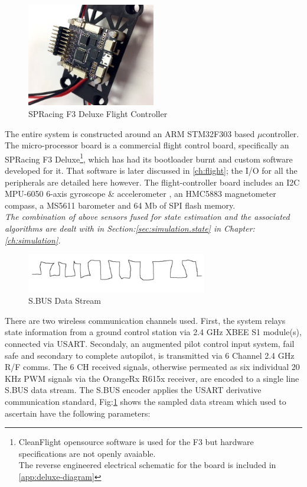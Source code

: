 \par
\begin{figure}
\centering
\includegraphics[width=0.5\textwidth]{figs/f3-deluxe}
\caption{SPRacing F3 Deluxe Flight Controller}
\end{figure}
The entire system is constructed around an ARM STM32F303\cite{stm32f303} based $\mu$controller. The micro-processor board is a commercial flight control board, specifically an SPRacing F3 Deluxe\cite{spracing}\footnote{CleanFlight opensource software is used for the F3 but hardware specifications are not openly avaiable.\\The reverse engineered electrical schematic for the board is included in \ref{app:deluxe-diagram}}, which has had its bootloader burnt and custom software developed for it. That software is later discussed in \ref{ch:flight}; the I/O for all the peripherals are detailed here however. The flight-controller board includes an I2C MPU-6050\cite{mpu6050} 6-axis gyroscope \& accelerometer , an HMC5883\cite{hmc5883} magnetometer compass, a MS5611\cite{ms5611} barometer and 64 Mb of SPI flash memory. 
\\
\emph{\color{Gray} The combination of above sensors fused for state estimation and the associated algorithms are dealt with in Section:\ref{sec:simulation.state} in Chapter:\ref{ch:simulation}.}
\par
\begin{figure}[hbtp]
\centering
\includegraphics[width=0.7\textwidth]{figs/sbus}
\caption{S.BUS Data Stream}
\label{fig:sbus}
\end{figure}
There are two wireless communication channels used. First, the system relays state information from a ground control station via 2.4 GHz XBEE S1 module(s)\cite{xbees1}, connected via USART. Secondaly, an augmented pilot control input system, fail safe and secondary to complete autopilot, is transmitted via 6 Channel 2.4 GHz R/F comms. The 6 CH received signals, otherwise permeated as six individual 20 KHz PWM signals via the OrangeRx R615x\cite{r615x} receiver, are encoded to a single line S.BUS data stream. The S.BUS encoder \cite{sbusencoder} applies the USART derivative communication standard, Fig:\ref{fig:sbus} shows the sampled data stream which used to ascertain have the following parameters:
